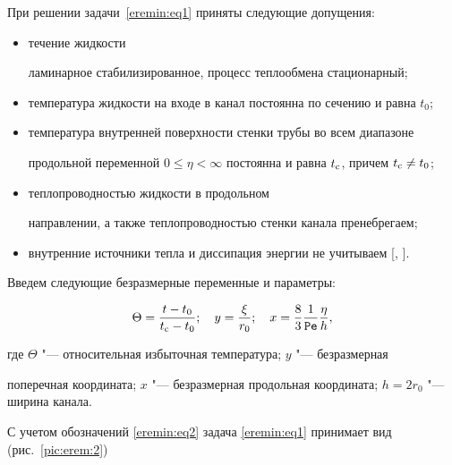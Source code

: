 При решении задачи~\eqref{eremin:eq1} приняты следующие допущения:

\begin{itemize}

\item[1)] течение жидкости

ламинарное стабилизированное, процесс теплообмена стационарный; 

\item[2)]

температура жидкости на входе в канал постоянна по сечению и равна $t_0$;

\item[3)] температура внутренней поверхности стенки трубы во всем диапазоне

продольной переменной $0\le \eta < \infty $ постоянна и равна $t_{\rm c}$, причем $t_{\rm c} \ne t_0$; 

\item[4)] теплопроводностью жидкости в продольном

направлении, а также теплопроводностью стенки канала пренебрегаем; 

\item[5)] внутренние источники тепла и диссипация энергии не учитываем [, ].

\end{itemize}



Введем следующие безразмерные переменные и параметры:

\begin{equation}

\label{eremin:eq2}

\Theta =\frac{t-t_0}{t_{\rm c}-t_0}; \quad y=\frac{\xi}{r_0

}; \quad x=\frac{8}{3}\frac{1}{{\tt Pe}}\frac{\eta }{h},

\end{equation}

где $\Theta $ "--- относительная избыточная температура; $y$ "--- безразмерная

поперечная координата; $x$ "--- безразмерная продольная координата; $h=2r_0

$ "--- ширина канала.



С учетом обозначений \eqref{eremin:eq2} задача \eqref{eremin:eq1} принимает вид (рис.~\ref{pic:erem:2})

